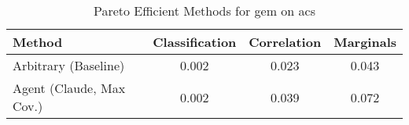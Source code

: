 \begin{table}[t!]
    \centering
    \caption{Pareto Efficient Methods for gem on acs}
    \label{tab:pareto_efficient_methods_gem_acs}
    \begin{tabular}{lccc}
    \toprule
    Method & Classification & Correlation & Marginals \\
    \midrule
    Arbitrary (Baseline) & \cellcolor{silver!30}0.002 & \cellcolor{gold!30}0.023 & \cellcolor{gold!30}0.043 \\
    Agent (Claude, Max Cov.) & \cellcolor{gold!30}0.002 & \cellcolor{silver!30}0.039 & \cellcolor{silver!30}0.072 \\
    \bottomrule
    \end{tabular}
\end{table}